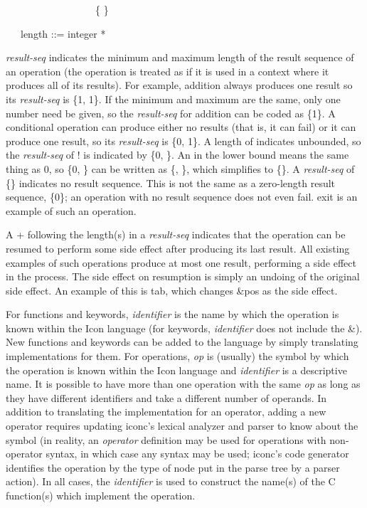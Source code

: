 {\ttfamily\mdseries
\ \ \ \ \ \ \ \ \ \ \ \ \ \ \ \ \ \ \{ \}}

{\ttfamily\mdseries
\ \ \ length ::= integer {\textbar} *}


\textit{result-seq} indicates the minimum and maximum length of the
result sequence of an operation (the operation is treated as if it is
used in a context where it produces all of its results). For example,
addition always produces one result so its \textit{result-seq} is \{1,
1\}. If the minimum and maximum are the same, only one number need be
given, so the \textit{result-seq} for addition can be coded as
\{1\}. A conditional operation can produce either no results (that is,
it can fail) or it can produce one result, so its \textit{result-seq}
is \{0, 1\}. A length of indicates unbounded, so the
\textit{result-seq} of ! is indicated by \{0, \}. An in the lower
bound means the same thing as 0, so \{0, \} can be written as \{, \},
which simplifies to \{\}. A \textit{result-seq} of \{\} indicates no
result sequence.  This is not the same as a zero-length result
sequence, \{0\}; an operation with no result sequence does not even
fail.  exit is an example of such an operation.

A + following the length(s) in a \textit{result-seq} indicates that
the operation can be resumed to perform some side effect after
producing its last result. All existing examples of such operations
produce at most one result, performing a side effect in the
process. The side effect on resumption is simply an undoing of the
original side effect. An example of this is tab, which changes \&pos
as the side effect.

For functions and keywords, \textit{identifier} is the name by which
the operation is known within the Icon language (for keywords,
\textit{identifier} does not include the \&). New functions and
keywords can be added to the language by simply translating
implementations for them. For operations, \textit{op} is (usually) the
symbol by which the operation is known within the Icon language and
\textit{identifier} is a descriptive name. It is possible to have more
than one operation with the same \textit{op} as long as they have
different identifiers and take a different number of operands.  In
addition to translating the implementation for an operator, adding a
new operator requires updating iconc's lexical analyzer and parser to
know about the symbol (in reality, an \textit{operator} definition may
be used for operations with non-operator syntax, in which case any
syntax may be used; iconc's code generator identifies the operation by
the type of node put in the parse tree by a parser action). In all
cases, the \textit{identifier} is used to construct the name(s) of the
C function(s) which implement the operation.



